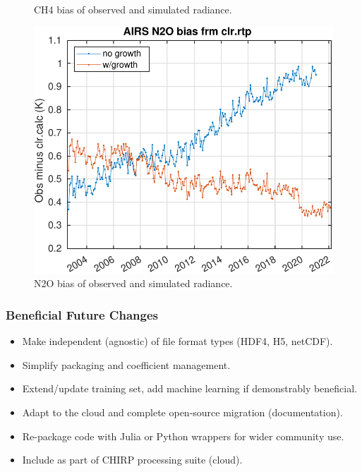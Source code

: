 \documentclass[10pt,t]{beamer}
\begin{document}
\begin{frame}
\begin{figure}
\begin{minipage}[c]{0.3\linewidth}
    \caption{CH4 bias of observed and simulated radiance.}
  \end{minipage}
\hfill
  \begin{minipage}[c]{0.3\linewidth}
    \includegraphics[width=\linewidth]{./Figs/airs_l1c_oc_bias_n2o_trend.pdf}
    \caption{N2O bias of observed and simulated radiance.}
  \end{minipage}
\end{figure}  

\end{frame}
\begin{frame}
  \frametitle{Beneficial Future Changes}
  \begin{itemize}
    \item Make independent (agnostic) of file format types (HDF4, H5, netCDF).
    \item Simplify packaging and coefficient management.
    \item Extend/update training set, add machine learning if demonstrably beneficial.
    \item Adapt to the cloud and complete open-source migration (documentation).
    \item Re-package code with Julia or Python wrappers for wider community use.
    \item Include as part of CHIRP processing suite (cloud).

\end{itemize}
\end{frame}
\end{document}
